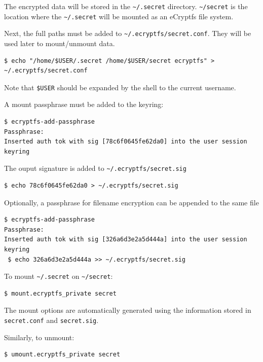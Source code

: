 The encrypted data will be stored in the \texttt{\textasciitilde/.secret} directory.
\texttt{\textasciitilde/secret} is the location where the \texttt{\textasciitilde/.secret} will be mounted as an eCryptfs file system.

Next, the full paths must be added to \texttt{\textasciitilde/.ecryptfs/secret.conf}. They will be used later to mount/unmount data.
\begin{lstlisting}[numbers=none]
$ echo "/home/$USER/.secret /home/$USER/secret ecryptfs" > ~/.ecryptfs/secret.conf
\end{lstlisting}
Note that \texttt{\$USER} should be expanded by the shell to the current username.

A mount passphrase must be added to the keyring:
\begin{lstlisting}[numbers=none]
$ ecryptfs-add-passphrase
Passphrase: 
Inserted auth tok with sig [78c6f0645fe62da0] into the user session keyring
\end{lstlisting}

The ouput signature is added to \texttt{\textasciitilde/.ecryptfs/secret.sig}
\begin{lstlisting}[numbers=none]
$ echo 78c6f0645fe62da0 > ~/.ecryptfs/secret.sig
\end{lstlisting}

Optionally, a passphrase for filename encryption can be appended to the same file
\begin{lstlisting}[numbers=none]
$ ecryptfs-add-passphrase
Passphrase: 
Inserted auth tok with sig [326a6d3e2a5d444a] into the user session keyring
 $ echo 326a6d3e2a5d444a >> ~/.ecryptfs/secret.sig
\end{lstlisting}

To mount \texttt{\textasciitilde/.secret} on \texttt{\textasciitilde/secret}:
\begin{lstlisting}[numbers=none]
$ mount.ecryptfs_private secret
\end{lstlisting}
The mount options are automatically generated using the information stored in \texttt{secret.conf} and \texttt{secret.sig}.

Similarly, to unmount:
\begin{lstlisting}[numbers=none]
$ umount.ecryptfs_private secret
\end{lstlisting}
